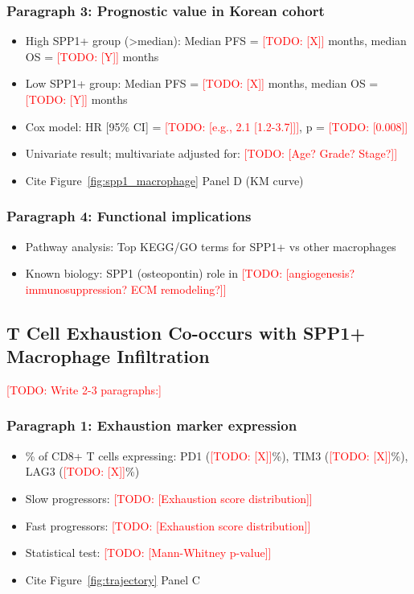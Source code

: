 \documentclass[12pt,oneside]{article}
\newcommand{\TODO}[1]{\textcolor{red}{[TODO: #1]}}
\newcommand{\FIG}[1]{Figure~\ref{fig:#1}}
\begin{document}
\subsubsection*{Paragraph 3: Prognostic value in Korean cohort}
\begin{itemize}
    \item High SPP1+ group (>median): Median PFS = \TODO{[X]} months, median OS = \TODO{[Y]} months
    \item Low SPP1+ group: Median PFS = \TODO{[X]} months, median OS = \TODO{[Y]} months
    \item Cox model: HR [95\% CI] = \TODO{[e.g., 2.1 [1.2-3.7]]}, p = \TODO{[0.008]}
    \item Univariate result; multivariate adjusted for: \TODO{[Age? Grade? Stage?]}
    \item Cite \FIG{spp1_macrophage} Panel D (KM curve)
\end{itemize}

\subsubsection*{Paragraph 4: Functional implications}
\begin{itemize}
    \item Pathway analysis: Top KEGG/GO terms for SPP1+ vs other macrophages
    \item Known biology: SPP1 (osteopontin) role in \TODO{[angiogenesis? immunosuppression? ECM remodeling?]}
\end{itemize}

\subsection{T Cell Exhaustion Co-occurs with SPP1+ Macrophage Infiltration}
\TODO{Write 2-3 paragraphs:}

\subsubsection*{Paragraph 1: Exhaustion marker expression}
\begin{itemize}
    \item \% of CD8+ T cells expressing: PD1 (\TODO{[X]}\%), TIM3 (\TODO{[X]}\%), LAG3 (\TODO{[X]}\%)
    \item Slow progressors: \TODO{[Exhaustion score distribution]}
    \item Fast progressors: \TODO{[Exhaustion score distribution]}
    \item Statistical test: \TODO{[Mann-Whitney p-value]}
    \item Cite \FIG{trajectory} Panel C
\end{itemize}
\end{document}
